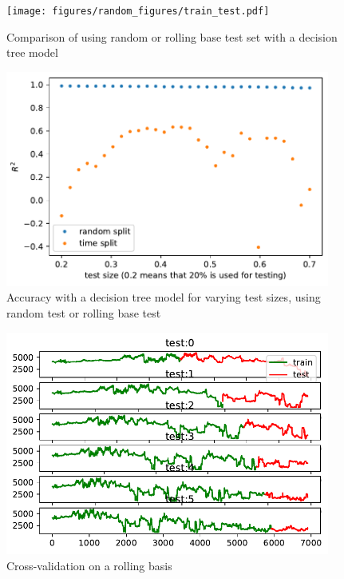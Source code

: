\begin{figure}[H]
\begin{center}\texttt{[image: figures/random\_figures/train\_test.pdf]}\end{center}
\vspace{-0.7cm}
\caption{Comparison of using random or rolling base test set with a decision tree model }
\label{fig:random_train_test}
\end{figure}
\begin{figure}[H]
\begin{center}\includegraphics[width = 0.95\textwidth]{figures/test_size_variation.pdf}\end{center}
\vspace{-0.7cm}
\caption{Accuracy with a decision tree model for varying test sizes, using random test or rolling base test}
\label{fig:test_size_variation}
\end{figure}
\begin{figure}[H]
\begin{center}\includegraphics[width = 0.95\textwidth]{figures/rolling_basis.pdf}\end{center}
\vspace{-0.7cm}
\caption{Cross-validation on a rolling basis}
\label{fig:rolling_basis}
\end{figure}
